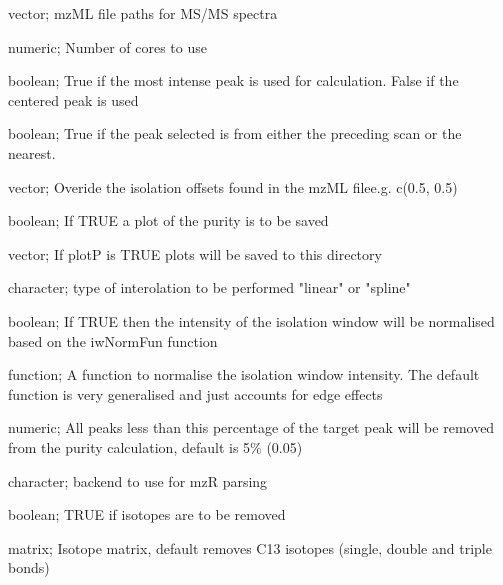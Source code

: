 \documentclass[letterpaper]{book}
\begin{document}
\begin{Arguments}
\begin{ldescription}
\item[\code{fileList}] vector; mzML file paths for MS/MS spectra

\item[\code{cores}] numeric; Number of cores to use

\item[\code{mostIntense}] boolean; True if the most intense peak is used for calculation. False if the centered peak is used

\item[\code{nearest}] boolean; True if the peak selected is from either the preceding scan or the nearest.

\item[\code{offsets}] vector; Overide the isolation offsets found in the mzML filee.g. c(0.5, 0.5)

\item[\code{plotP}] boolean; If TRUE a plot of the purity is to be saved

\item[\code{plotdir}] vector; If plotP is TRUE plots will be saved to this directory

\item[\code{interpol}] character; type of interolation to be performed "linear" or "spline"

\item[\code{iwNorm}] boolean; If TRUE then the intensity of the isolation window will be normalised based on the iwNormFun function

\item[\code{iwNormFun}] function; A function to normalise the isolation window intensity. The default function is very generalised and just accounts for edge effects

\item[\code{ilim}] numeric; All peaks less than this percentage of the target peak will be removed from the purity calculation, default is 5\% (0.05)

\item[\code{mzRback}] character; backend to use for mzR parsing

\item[\code{isotopes}] boolean; TRUE if isotopes are to be removed

\item[\code{im}] matrix; Isotope matrix, default removes C13 isotopes (single, double and triple bonds)
\end{ldescription}
\end{Arguments}
\end{document}
